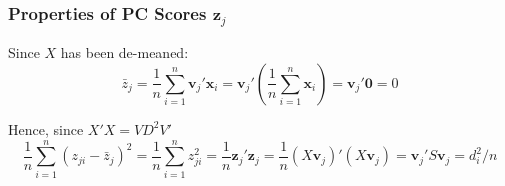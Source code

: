 \begin{frame}
  \frametitle{Properties of PC Scores $\mathbf{z}_j$}

  Since $X$ has been de-meaned:
  \[
    \bar{z}_j = \frac{1}{n}\sum_{i=1}^n \mathbf{v}_j'\mathbf{x}_i = \mathbf{v}_j' \left( \frac{1}{n}\sum_{i=1}^n \mathbf{x}_i \right) = \mathbf{v}_j' \mathbf{0} = 0
  \]

  Hence, since $X'X = VD^2V'$
  \[
    \frac{1}{n}\sum_{i=1}^n (z_{ji} - \bar{z}_j)^2 = \frac{1}{n} \sum_{i=1}^n z_{ji}^2 = \frac{1}{n} \mathbf{z}_j'\mathbf{z}_j = \frac{1}{n}\left( X\mathbf{v}_j \right)'\left( X\mathbf{v}_j \right) = \mathbf{v}_j' S\mathbf{v}_j = d_i^2/n
  \]

  
\end{frame}
